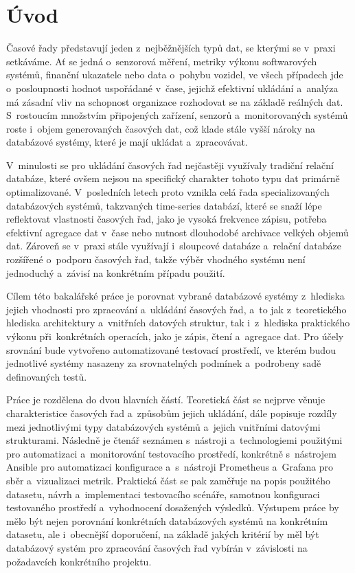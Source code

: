 \chapter{Úvod}
Časové řady představují jeden z~nejběžnějších typů dat, se kterými se v~praxi setkáváme. 
Ať se jedná o~senzorová měření, metriky výkonu softwarových systémů, finanční ukazatele nebo data o~pohybu vozidel, ve všech případech jde o~posloupnosti hodnot uspořádané v~čase, jejichž efektivní ukládání a~analýza má zásadní vliv na schopnost organizace rozhodovat se na základě reálných dat. 
S~rostoucím množstvím připojených zařízení, senzorů a~monitorovaných systémů roste i~objem generovaných časových dat, což klade stále vyšší nároky na databázové systémy, které je mají ukládat a~zpracovávat.

V~minulosti se pro ukládání časových řad nejčastěji využívaly tradiční relační databáze, které ovšem nejsou na specifický charakter tohoto typu dat primárně optimalizované. 
V~posledních letech proto vznikla celá řada specializovaných databázových systémů, takzvaných time-series databází, které se snaží lépe reflektovat vlastnosti časových řad, jako je vysoká frekvence zápisu, potřeba efektivní agregace dat v~čase nebo nutnost dlouhodobé archivace velkých objemů dat. 
Zároveň se v~praxi stále využívají i~sloupcové databáze a~relační databáze rozšířené o~podporu časových řad, takže výběr vhodného systému není jednoduchý a~závisí na konkrétním případu použití.

Cílem této bakalářské práce je porovnat vybrané databázové systémy z~hlediska jejich vhodnosti pro zpracování a~ukládání časových řad, a~to jak z~teoretického hlediska architektury a~vnitřních datových struktur, tak i~z~hlediska praktického výkonu při~konkrétních operacích, jako je zápis, čtení a~agregace dat. 
Pro účely srovnání bude vytvořeno automatizované testovací prostředí, ve kterém budou jednotlivé systémy nasazeny za srovnatelných podmínek a~podrobeny sadě definovaných testů.

Práce je rozdělena do dvou hlavních částí. Teoretická část se nejprve věnuje charakteristice časových řad a~způsobům jejich ukládání, dále popisuje rozdíly mezi jednotlivými typy databázových systémů a~jejich vnitřními datovými strukturami. 
Následně je čtenář seznámen s~nástroji a~technologiemi použitými pro automatizaci a~monitorování testovacího prostředí, konkrétně s~nástrojem Ansible pro automatizaci konfigurace a~s~nástroji Prometheus a~Grafana pro sběr a~vizualizaci metrik. 
Praktická část se pak zaměřuje na popis použitého datasetu, návrh a~implementaci testovacího scénáře, samotnou konfiguraci testovaného prostředí a~vyhodnocení dosažených výsledků.
Výstupem práce by mělo být nejen porovnání konkrétních databázových systémů na konkrétním datasetu, ale i~obecnější doporučení, na základě jakých kritérií by měl být databázový systém pro zpracování časových řad vybírán v~závislosti na požadavcích konkrétního projektu.